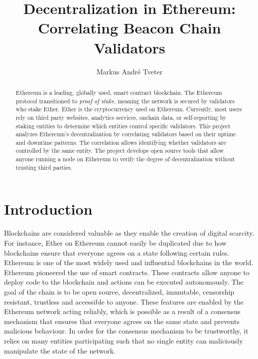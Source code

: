 \documentclass[runningheads]{llncs}
\begin{document}
%
\title{Decentralization in Ethereum: Correlating Beacon Chain Validators}
%
%
\author{Markus André Tveter}

%
%
%
\maketitle              %
%
\begin{abstract}
Ethereum is a leading, globally used, smart contract block\-chain.
The Ethereum protocol transitioned to {\em proof of stake}, meaning the network is secured by validators who stake Ether.
Ether is the cryptocurrency used on Ethereum. Currently, most users rely on third party websites, analytics services, onchain data, or self-reporting by staking entities to determine which entities control specific validators.
This project analyzes Ethereum's decentralization by correlating validators based on their uptime and downtime patterns. The correlation allows identifying whether validators are controlled by the same entity.
The project develops open source tools that allow anyone running a node on Ethereum to verify the degree of decentralization without trusting third parties.

\end{abstract}

\section{Introduction}
Blockchains are considered valuable as they enable the creation of digital scarcity.
For instance, Ether on Ethereum cannot easily be duplicated due to how block\-chains ensure that everyone agrees on a state following certain rules.
Ethereum is one of the most widely used and influential blockchains in the world.
Ethereum pioneered the use of smart contracts.
These contracts allow anyone to deploy code to the blockchain and actions can be executed autonomously. 
The goal of the chain is to be open source, decentralized, immutable, censorship resistant, trustless and accessible to anyone.
These features are enabled by the Ethereum network acting reliably, which is possible as a result of a consensus mechanism that ensures that everyone agrees on the same state and prevents malicious behaviour. 
In order for the consensus mechanism to be trustworthy, it relies on many entities participating such that no single entity can maliciously manipulate the state of the network.
\end{document}

